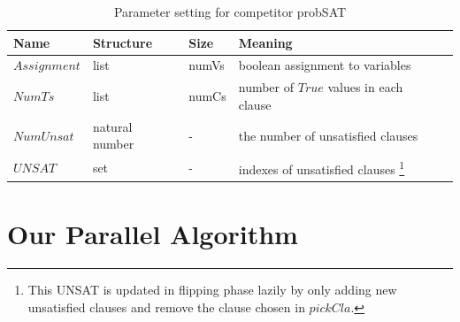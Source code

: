 \documentclass[12pt,a4paper,twoside]{scrartcl}
\numberwithin{equation}{section}
\begin{document}
\begin{table}[h!]
\begin{center}
    \begin{tabular}{|l|l|l|l|p{1cm}|}
\hline 
 	Name &Structure & Size & Meaning\\ \hline
    $Assignment$&list & numVs & boolean assignment to variables\\ \hline
	$NumTs$&list & numCs& number of $True$ values in each clause \\ \hline
	$NumUnsat$& natural number & -&the number of unsatisfied clauses  \\ \hline
	$UNSAT$& set & - & indexes of unsatisfied clauses \footnote{This UNSAT is updated in flipping phase lazily by only adding new unsatisfied clauses and remove the clause chosen in $pickCla$.}\\ \hline

	
\end{tabular}
\caption[probSAT]{Parameter setting for competitor probSAT}
\end{center}
\end{table} 
\clearpage
\section{Our Parallel Algorithm}
\label{sec:parallel}
\label{sec:Our parallel Algorithm}
\end{document}
